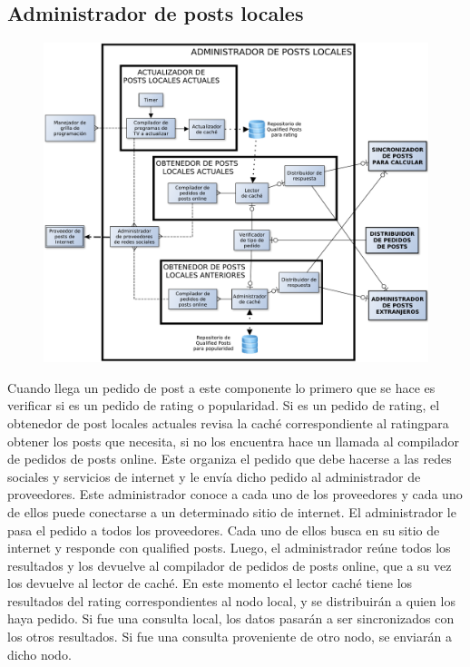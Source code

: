 \subsection{Administrador de posts locales}

\begin{figure}[H]
\centering
\includegraphics[width=\textwidth]{graph/adminlocal.pdf}
\end{figure}

Cuando llega un pedido de post a este componente lo primero que se hace es verificar si es un pedido de rating o popularidad. 
Si es un pedido de rating, el obtenedor de post locales actuales revisa la caché correspondiente al ratingpara obtener los posts que necesita, si no los encuentra hace un llamada al compilador de pedidos de posts online. Este organiza el pedido que debe hacerse a las redes sociales y servicios de internet y le envía dicho pedido al administrador de proveedores. Este administrador conoce a cada uno de los proveedores y cada uno de ellos puede conectarse a un determinado sitio de internet. El administrador le pasa el pedido a todos los proveedores. Cada uno de ellos busca en su sitio de internet y responde con qualified posts. Luego, el administrador reúne todos los resultados y los devuelve al compilador de pedidos de posts online, que a su vez los devuelve al lector de caché. En este momento el lector caché tiene los resultados del rating correspondientes al nodo local, y se distribuirán a quien los haya pedido. Si fue una consulta local, los datos pasarán a ser sincronizados con los otros resultados. Si fue una consulta proveniente de otro nodo, se enviarán a dicho nodo.

